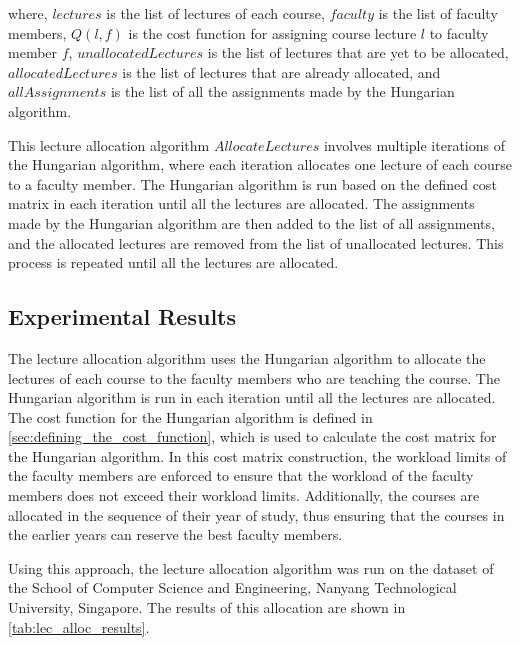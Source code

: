 where, \(lectures\) is the list of lectures of each course, \(faculty\) is the list of faculty members, \(Q(l, f)\) is the cost function for assigning course lecture \(l\) to faculty member \(f\), \(unallocatedLectures\) is the list of lectures that are yet to be allocated, \(allocatedLectures\) is the list of lectures that are already allocated, and \(allAssignments\) is the list of all the assignments made by the Hungarian algorithm.

This lecture allocation algorithm $AllocateLectures$ involves multiple iterations of the Hungarian algorithm, where each iteration allocates one lecture of each course to a faculty member. The Hungarian algorithm is run based on the defined cost matrix in each iteration until all the lectures are allocated. The assignments made by the Hungarian algorithm are then added to the list of all assignments, and the allocated lectures are removed from the list of unallocated lectures. This process is repeated until all the lectures are allocated.

\subsection{Experimental Results}

The lecture allocation algorithm uses the Hungarian algorithm to allocate the lectures of each course to the faculty members who are teaching the course. The Hungarian algorithm is run in each iteration until all the lectures are allocated. The cost function for the Hungarian algorithm is defined in \autoref{sec:defining_the_cost_function}, which is used to calculate the cost matrix for the Hungarian algorithm. In this cost matrix construction, the workload limits of the faculty members are enforced to ensure that the workload of the faculty members does not exceed their workload limits. Additionally, the courses are allocated in the sequence of their year of study, thus ensuring that the courses in the earlier years can reserve the best faculty members.

Using this approach, the lecture allocation algorithm was run on the dataset of the School of Computer Science and Engineering, Nanyang Technological University, Singapore. The results of this allocation are shown in \autoref{tab:lec_alloc_results}.

